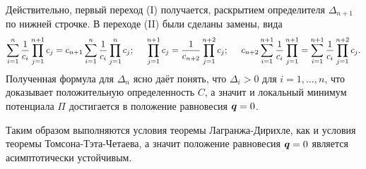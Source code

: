 Действительно, первый переход (I) получается, раскрытием определителя $\Delta_{n+1}$ по нижней строчке. В переходе (II) были сделаны замены, вида
\begin{equation*}
        \sum_{i=1}^{n} \frac{1}{c_i}
            \prod_{j=1}^{n+1} c_j
        = 
        c_{n+1} \sum\limits_{i=1}^{n} \frac{1}{c_i}
            \prod\limits_{j=1}^{n} c_j
        ; \hspace{0.5 cm}
        \prod_{j=1}^{n+1} c_j = 
        \frac{1}{c_{n+2}} \prod_{j=1}^{n+2} c_j
        ; \hspace{0.5 cm}
        c_{n+2} \sum_{i=1}^{n+1} \frac{1}{c_i} \prod_{j=1}^{n+1}
        =
        \sum_{i=1}^{n+1} \frac{1}{c_i} \prod_{j=1}^{n+2} c_j.        
\end{equation*}
Полученная формула для $\Delta_n$ ясно даёт понять, что $\Delta_i > 0$ для $i = 1, \ldots, n$, что доказывает положительную определенность $C$, а значит и локальный минимум потенциала $\Pi$ достигается в положение равновесия $\mbox{\boldmath $q$}=0$. 

Таким образом выполняются условия теоремы Лагранжа-Дирихле, как и условия теоремы Томсона-Тэта-Четаева, а значит положение равновесия $\mbox{\boldmath $q$}=0$ является асимптотически устойчивым.


